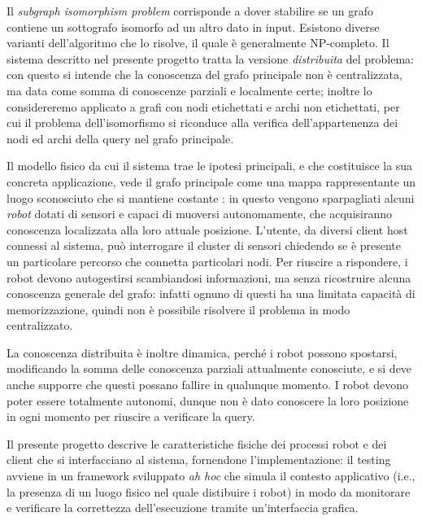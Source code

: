 Il \emph{subgraph isomorphism problem} corrisponde a dover
stabilire se un grafo contiene un sottografo isomorfo ad
un altro dato in input.
Esistono diverse varianti dell'algoritmo che lo risolve, il quale è
generalmente NP-completo.
Il sistema descritto nel presente progetto
tratta la versione \emph{distribuita} del problema:
con questo si intende che la conoscenza del grafo principale non
è centralizzata, ma data come somma di conoscenze parziali e
localmente certe; inoltre lo considereremo applicato
a grafi con nodi etichettati e archi non etichettati,
per cui il problema dell'isomorfismo si riconduce alla verifica
dell'appartenenza dei nodi ed archi della query nel grafo principale.

Il modello fisico da cui il sistema trae le ipotesi principali,
e che costituisce la sua concreta applicazione, vede il grafo
principale come una mappa rappresentante un luogo sconosciuto
che si mantiene costante
:
in questo vengono sparpagliati alcuni \emph{robot}
dotati di sensori e capaci di muoversi autonomamente, che acquisiranno
conoscenza localizzata alla loro attuale posizione.
L'utente, da diversi client host connessi al sistema, può
interrogare il cluster di sensori chiedendo se è
presente un particolare percorso che connetta particolari nodi.
Per riuscire a rispondere, i robot devono autogestirsi scambiandosi
informazioni, ma senza ricostruire alcuna conoscenza generale del grafo:
infatti ognuno di questi ha una limitata capacità di memorizzazione,
quindi non è possibile risolvere il problema in modo centralizzato.

La conoscenza distribuita è inoltre dinamica, perché i robot
possono spostarsi, modificando la somma delle conoscenza parziali
attualmente conosciute, e si deve anche supporre che questi possano
fallire in qualunque momento.
I robot devono poter essere totalmente autonomi, dunque non
è dato conoscere la loro posizione in ogni momento per
riuscire a verificare la query.

Il presente progetto descrive le caratteristiche fisiche dei
processi robot e dei client che si interfacciano al sistema,
fornendone l'implementazione: il testing
avviene in un framework sviluppato \emph{ah hoc}
che simula il contesto applicativo (i.e., la presenza di un luogo
fisico nel quale distibuire i robot)
in modo da monitorare e verificare la correttezza dell'esecuzione
tramite un'interfaccia grafica.
